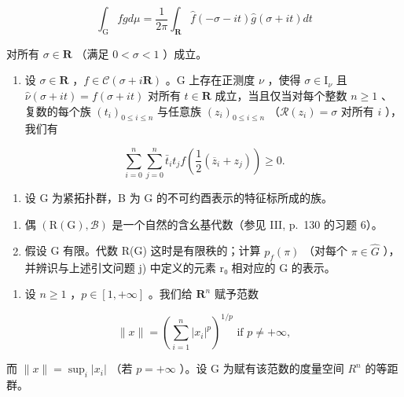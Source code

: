 \[
\int_ {\mathrm{G}} f g d \mu = \frac {1}{2 \pi} \int_ {\mathbf {R}} \widehat {f} (- \sigma - i t) \widehat {g} (\sigma + i t) d t
\]

对所有 \(\sigma\in\mathbf{R}\) （满足 \(0<\sigma<1\) ）成立。

\begin{enumerate}
\def\labelenumi{\alph{enumi})}
\setcounter{enumi}{5}
\tightlist
\item
  设 \(\sigma \in \mathbf{R}\) ，\(f \in \mathcal{C}(\sigma + i\mathbf{R})\) 。G 上存在正测度 \(\nu\) ，使得 \(\sigma \in \mathrm{I}_{\nu}\) 且 \(\widehat{\nu}(\sigma + it) = f(\sigma + it)\) 对所有 \(t \in \mathbf{R}\) 成立，当且仅当对每个整数 \(n \geqslant 1\) 、复数的每个族 \((t_i)_{0 \leqslant i \leqslant n}\) 与任意族 \((z_i)_{0 \leqslant i \leqslant n}\) （\(\mathcal{R}(z_i) = \sigma\) 对所有 \(i\) ），我们有
\end{enumerate}

\[
\sum_ {i = 0} ^ {n} \sum_ {j = 0} ^ {n} \bar {t} _ {i} t _ {j} f \left(\frac {1}{2} (\overline {{z}} _ {i} + z _ {j})\right) \geqslant 0.
\]

\exercisesection{}

\begin{enumerate}
\def\labelenumi{\arabic{enumi})}
\tightlist
\item
  设 G 为紧拓扑群，B 为 G 的不可约酉表示的特征标所成的族。
\end{enumerate}

\begin{enumerate}
\def\labelenumi{\alph{enumi})}
\item
  偶 \((\mathrm{R}(\mathrm{G}),\mathcal{B})\) 是一个自然的含幺基代数（参见 III, p.~130 的习题 6）。
\item
  假设 G 有限。代数 R(G) 这时是有限秩的；计算 \(p_f(\pi)\) （对每个 \(\pi \in \widehat{G}\) ），并辨识与上述引文问题 j) 中定义的元素 r₀ 相对应的 G 的表示。
\end{enumerate}

\begin{enumerate}
\def\labelenumi{\arabic{enumi})}
\setcounter{enumi}{1}
\tightlist
\item
  设 \(n \geqslant 1\) ，\(p \in [1, +\infty]\) 。我们给 \(\mathbf{R}^n\) 赋予范数
\end{enumerate}

\[
\| x \| = \left(\sum_ {i = 1} ^ {n} | x _ {i} | ^ {p}\right) ^ {1 / p} \text {   if   } p \neq + \infty ,
\]

而 \(\|x\| = \sup_{i}|x_{i}|\) （若 \(p = +\infty\) ）。设 G 为赋有该范数的度量空间 \(R^{n}\) 的等距群。

